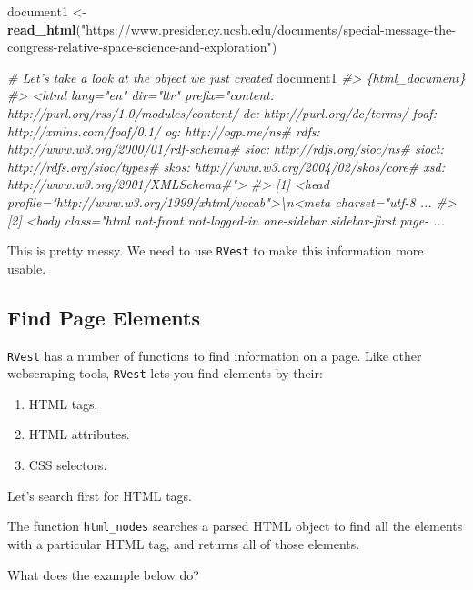 \documentclass[
]{book}
\newenvironment{Shaded}{\begin{snugshade}}{\end{snugshade}}
\newcommand{\CommentTok}[1]{\textcolor[rgb]{0.56,0.35,0.01}{\textit{#1}}}
\newcommand{\KeywordTok}[1]{\textcolor[rgb]{0.13,0.29,0.53}{\textbf{#1}}}
\newcommand{\NormalTok}[1]{#1}
\newcommand{\StringTok}[1]{\textcolor[rgb]{0.31,0.60,0.02}{#1}}
\providecommand{\tightlist}{%
  \setlength{\itemsep}{0pt}\setlength{\parskip}{0pt}}
\begin{document}
\begin{Shaded}
\begin{Highlighting}[]
\NormalTok{document1 <-}\StringTok{ }\KeywordTok{read_html}\NormalTok{(}\StringTok{"https://www.presidency.ucsb.edu/documents/special-message-the-congress-relative-space-science-and-exploration"}\NormalTok{)}

\CommentTok{# Let's take a look at the object we just created}
\NormalTok{document1}
\CommentTok{#> \{html_document\}}
\CommentTok{#> <html lang="en" dir="ltr" prefix="content: http://purl.org/rss/1.0/modules/content/ dc: http://purl.org/dc/terms/ foaf: http://xmlns.com/foaf/0.1/ og: http://ogp.me/ns# rdfs: http://www.w3.org/2000/01/rdf-schema# sioc: http://rdfs.org/sioc/ns# sioct: http://rdfs.org/sioc/types# skos: http://www.w3.org/2004/02/skos/core# xsd: http://www.w3.org/2001/XMLSchema#">}
\CommentTok{#> [1] <head profile="http://www.w3.org/1999/xhtml/vocab">\textbackslash{}n<meta charset="utf-8 ...}
\CommentTok{#> [2] <body class="html not-front not-logged-in one-sidebar sidebar-first page- ...}
\end{Highlighting}
\end{Shaded}

This is pretty messy. We need to use \texttt{RVest} to make this information more usable.

\hypertarget{find-page-elements}{%
\subsection{Find Page Elements}\label{find-page-elements}}

\texttt{RVest} has a number of functions to find information on a page. Like other webscraping tools, \texttt{RVest} lets you find elements by their:

\begin{enumerate}
\def\labelenumi{\arabic{enumi}.}
\tightlist
\item
  HTML tags.
\item
  HTML attributes.
\item
  CSS selectors.
\end{enumerate}

Let's search first for HTML tags.

The function \texttt{html\_nodes} searches a parsed HTML object to find all the elements with a particular HTML tag, and returns all of those elements.

What does the example below do?
\end{document}
